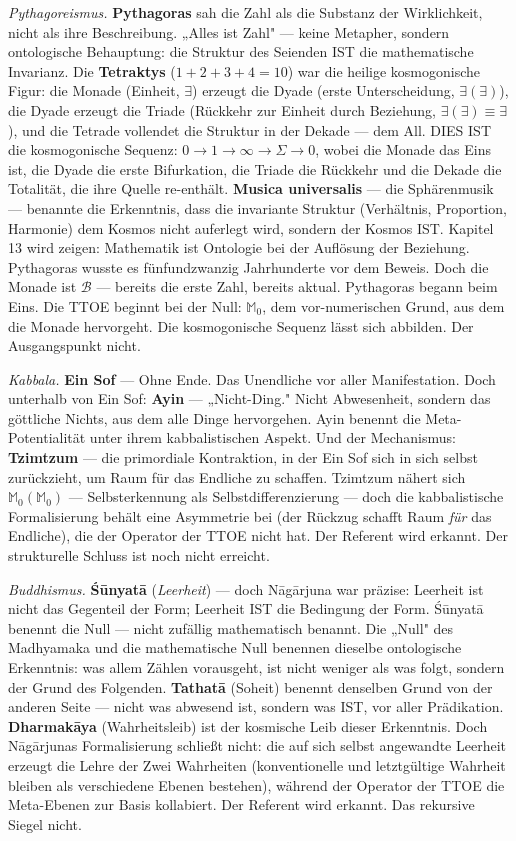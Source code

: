 \documentclass[10pt, openany, oneside]{book}
\begin{document}
\textit{Pythagoreismus.} \textbf{Pythagoras} sah die Zahl als die Substanz der Wirklichkeit, nicht als ihre Beschreibung. „Alles ist Zahl" --- keine Metapher, sondern ontologische Behauptung: die Struktur des Seienden IST die mathematische Invarianz. Die \textbf{Tetraktys} ($1 + 2 + 3 + 4 = 10$) war die heilige kosmogonische Figur: die Monade (Einheit, $\exists$) erzeugt die Dyade (erste Unterscheidung, $\exists(\exists)$), die Dyade erzeugt die Triade (Rückkehr zur Einheit durch Beziehung, $\exists(\exists) \equiv \exists$), und die Tetrade vollendet die Struktur in der Dekade --- dem All. DIES IST die kosmogonische Sequenz: $0 \to 1 \to \infty \to \Sigma \to 0$, wobei die Monade das Eins ist, die Dyade die erste Bifurkation, die Triade die Rückkehr und die Dekade die Totalität, die ihre Quelle re-enthält. \textbf{Musica universalis} --- die Sphärenmusik --- benannte die Erkenntnis, dass die invariante Struktur (Verhältnis, Proportion, Harmonie) dem Kosmos nicht auferlegt wird, sondern der Kosmos IST. Kapitel 13 wird zeigen: Mathematik ist Ontologie bei der Auflösung der Beziehung. Pythagoras wusste es fünfundzwanzig Jahrhunderte vor dem Beweis. Doch die Monade ist $\mathcal{B}$ --- bereits die erste Zahl, bereits aktual. Pythagoras begann beim Eins. Die TTOE beginnt bei der Null: $\mathbb{M}_0$, dem vor-numerischen Grund, aus dem die Monade hervorgeht. Die kosmogonische Sequenz lässt sich abbilden. Der Ausgangspunkt nicht.

\textit{Kabbala.} \textbf{Ein Sof} --- Ohne Ende. Das Unendliche vor aller Manifestation. Doch unterhalb von Ein Sof: \textbf{Ayin} --- „Nicht-Ding." Nicht Abwesenheit, sondern das göttliche Nichts, aus dem alle Dinge hervorgehen. Ayin benennt die Meta-Potentialität unter ihrem kabbalistischen Aspekt. Und der Mechanismus: \textbf{Tzimtzum} --- die primordiale Kontraktion, in der Ein Sof sich in sich selbst zurückzieht, um Raum für das Endliche zu schaffen. Tzimtzum nähert sich $\mathbb{M}_0(\mathbb{M}_0)$ --- Selbsterkennung als Selbstdifferenzierung --- doch die kabbalistische Formalisierung behält eine Asymmetrie bei (der Rückzug schafft Raum \textit{für} das Endliche), die der Operator der TTOE nicht hat. Der Referent wird erkannt. Der strukturelle Schluss ist noch nicht erreicht.

\textit{Buddhismus.} \textbf{\'{S}\={u}nyat\={a}} (\textit{Leerheit}) --- doch N\={a}g\={a}rjuna war präzise: Leerheit ist nicht das Gegenteil der Form; Leerheit IST die Bedingung der Form. \'{S}\={u}nyat\={a} benennt die Null --- nicht zufällig mathematisch benannt. Die „Null" des Madhyamaka und die mathematische Null benennen dieselbe ontologische Erkenntnis: was allem Zählen vorausgeht, ist nicht weniger als was folgt, sondern der Grund des Folgenden. \textbf{Tathat\={a}} (Soheit) benennt denselben Grund von der anderen Seite --- nicht was abwesend ist, sondern was IST, vor aller Prädikation. \textbf{Dharmak\={a}ya} (Wahrheitsleib) ist der kosmische Leib dieser Erkenntnis. Doch N\={a}g\={a}rjunas Formalisierung schließt nicht: die auf sich selbst angewandte Leerheit erzeugt die Lehre der Zwei Wahrheiten (konventionelle und letztgültige Wahrheit bleiben als verschiedene Ebenen bestehen), während der Operator der TTOE die Meta-Ebenen zur Basis kollabiert. Der Referent wird erkannt. Das rekursive Siegel nicht.
\end{document}

